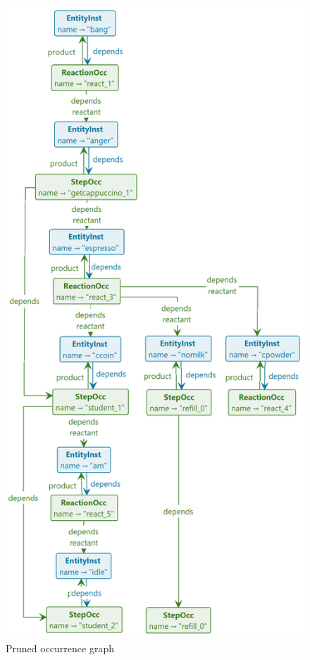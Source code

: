 \begin{figure}
\centering
\includegraphics[width=\columnwidth]{figs/toy-pruned}
\caption{Pruned occurrence graph}
\label{fig:toy-pruned}
\end{figure}


